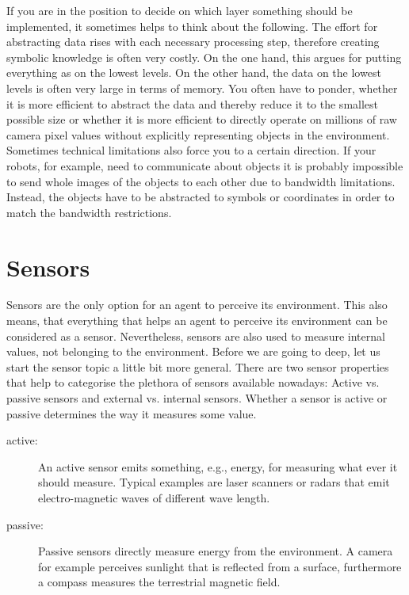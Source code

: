 If you are in the position to decide on which layer something should be implemented, it sometimes helps to think about the following. The effort for abstracting data rises with each necessary processing step, therefore creating symbolic knowledge is often very costly. On the one hand, this argues for putting everything as on the lowest levels. On the other hand, the data on the lowest levels is often very large in terms of memory. You often have to ponder, whether it is more efficient to abstract the data and thereby reduce it to the smallest possible size or whether it is more efficient to directly operate on millions of raw camera pixel values without explicitly representing objects in the environment. Sometimes technical limitations also force you to a certain direction. If your robots, for example, need to communicate about objects it is probably impossible to send whole images of the objects to each other due to bandwidth limitations. Instead, the objects have to be abstracted to symbols or coordinates in order to match the bandwidth restrictions.

\section{Sensors}
\label{sec:sensor}

Sensors are the only option for an agent to perceive its environment. This also means, that everything that helps an agent to perceive its environment can be considered as a sensor. Nevertheless, sensors are also used to measure internal values, not belonging to the environment. Before we are going to deep, let us start the sensor topic a little bit more general. There are two sensor properties that help to categorise the plethora of sensors available nowadays: Active vs. passive sensors and external vs. internal sensors. Whether a sensor is active or passive determines the way it measures some value.

\begin{description}
 \item [active:] An active sensor emits something, e.g., energy, for measuring what ever it should measure. Typical examples are laser scanners or radars that emit electro-magnetic waves of different wave length.
 \item [passive:] Passive sensors directly measure energy from the environment. A camera for example perceives sunlight that is reflected from a surface, furthermore a compass measures the terrestrial magnetic field.
\end{description}


